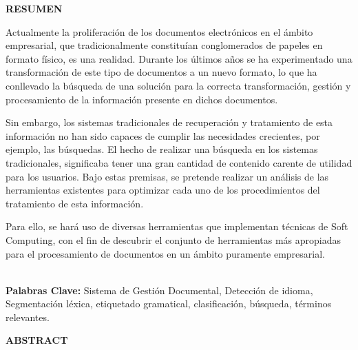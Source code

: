 \documentclass[runningheads,a4paper]{llncs}
\theoremstyle{break}
\begin{document}

\renewcommand{\listtablename}{Índice de tablas}
\renewcommand{\tablename}{Tabla}

\renewcommand{\appendixname}{Anexos}
\renewcommand{\appendixtocname}{Anexos}
\renewcommand{\appendixpagename}{Anexos}
\renewcommand{\lstlistingname}{Código}
\renewcommand{\lstlistlistingname}{Índice de códigos}

\mainmatter

\tableofcontents
\newpage
\listoftables
\newpage
\listoffigures
\newpage

\large\textbf{RESUMEN}
\textbf{}\\

\large{
Actualmente la proliferación de los documentos electrónicos en el ámbito empresarial, que tradicionalmente constituían conglomerados de papeles en formato físico, es una realidad. Durante los últimos años se ha experimentado una transformación de este tipo de documentos a un nuevo formato, lo que ha conllevado la búsqueda de una solución para la correcta transformación, gestión y procesamiento de la información presente en dichos documentos.



Sin embargo, los sistemas tradicionales de recuperación y tratamiento de esta información no han sido capaces de cumplir las necesidades crecientes, por ejemplo, las búsquedas. El hecho de realizar una búsqueda en los sistemas tradicionales, significaba tener una gran cantidad  de contenido carente de utilidad para los usuarios. Bajo estas premisas, se pretende realizar un análisis de las herramientas existentes para optimizar cada uno de los procedimientos del tratamiento de esta información.

Para ello, se hará uso de diversas herramientas que implementan técnicas de Soft Computing, con el fin de descubrir el conjunto de herramientas más apropiadas para el procesamiento de documentos en un ámbito puramente empresarial.

\textbf{}\\

\textbf{Palabras Clave:} Sistema de Gestión Documental, Detección de idioma, Segmentación léxica, etiquetado gramatical, clasificación, búsqueda, términos relevantes.
}

\pagebreak

\large\textbf{ABSTRACT}
\textbf{}\\
\end{document}

